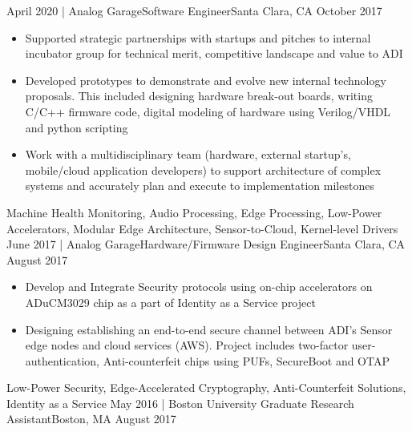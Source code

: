 \begin{experiences}
  \experience
    {April 2020}   {| Analog Garage}{Software Engineer}{Santa Clara, CA}
    {October 2017} {
                      \begin{itemize}
                        \item Supported strategic partnerships with startups and pitches to internal incubator group for technical merit, competitive landscape and value to ADI
                        \item Developed prototypes to demonstrate and evolve new internal technology proposals. This included designing hardware break-out boards, writing C/C++ firmware code, digital modeling of hardware using Verilog/VHDL and python scripting
                        \item Work with a multidisciplinary team (hardware, external startup’s, mobile/cloud application developers) to support architecture of complex systems and accurately plan and execute to implementation milestones\\
                      \end{itemize}
                    }
                    {Machine Health Monitoring, Audio Processing, Edge Processing, Low-Power Accelerators, Modular Edge Architecture, Sensor-to-Cloud, Kernel-level Drivers}
  \emptySeparator
  \experience
    {June 2017} {| Analog Garage}{Hardware/Firmware Design Engineer}{Santa Clara, CA}
    {August 2017}    {
                      \begin{itemize}
                        \item Develop and Integrate Security protocols using on-chip accelerators on ADuCM3029 chip as a part of Identity as a Service project
                        \item Designing establishing an end-to-end secure channel between ADI's Sensor edge nodes and cloud services (AWS). Project includes two-factor user-authentication, Anti-counterfeit chips using PUFs, SecureBoot and OTAP \\
                      \end{itemize}
                    }
                    {Low-Power Security, Edge-Accelerated Cryptography, Anti-Counterfeit Solutions, Identity as a Service}
  \emptySeparator
  \experience
  {May 2016}       {| Boston University}{ Graduate Research Assistant}{Boston, MA}
  {August 2017}    {
}
\end{experiences}
